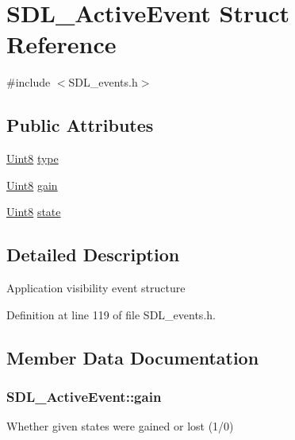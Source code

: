 \hypertarget{struct_s_d_l___active_event}{}\section{S\+D\+L\+\_\+\+Active\+Event Struct Reference}
\label{struct_s_d_l___active_event}


{\ttfamily \#include $<$S\+D\+L\+\_\+events.\+h$>$}

\subsection*{Public Attributes}
\begin{DoxyCompactItemize}
\item 
\hyperlink{_s_d_l__stdinc_8h_a2944638813a090aa23e62f4da842c3e2}{Uint8} \hyperlink{struct_s_d_l___active_event_a4a719c0224f4c0079043432f540621c4}{type}
\item 
\hyperlink{_s_d_l__stdinc_8h_a2944638813a090aa23e62f4da842c3e2}{Uint8} \hyperlink{struct_s_d_l___active_event_a4887e4fa212696de9fa8803691dfe5c9}{gain}
\item 
\hyperlink{_s_d_l__stdinc_8h_a2944638813a090aa23e62f4da842c3e2}{Uint8} \hyperlink{struct_s_d_l___active_event_af8f060502a9c906b25a4aa9c61f745f9}{state}
\end{DoxyCompactItemize}


\subsection{Detailed Description}
Application visibility event structure 

Definition at line 119 of file S\+D\+L\+\_\+events.\+h.



\subsection{Member Data Documentation}
\hypertarget{struct_s_d_l___active_event_a4887e4fa212696de9fa8803691dfe5c9}{}
\subsubsection[{gain}]{ S\+D\+L\+\_\+\+Active\+Event\+::gain}\label{struct_s_d_l___active_event_a4887e4fa212696de9fa8803691dfe5c9}
Whether given states were gained or lost (1/0) 

